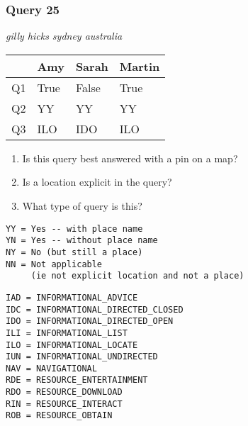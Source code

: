\begin{frame}[fragile]
\frametitle{Query 25}
\vspace{1em}

\emph{gilly hicks sydney australia}

\vfill

\begin{table}
  \centering
  \begin{tabular}{ l l l l }
    & \textbf{Amy} & \textbf{Sarah} & \textbf{Martin}\\
    \toprule
    Q1 & True & False & True\\
Q2 & YY & YY & YY\\
Q3 & ILO & IDO & ILO\\
    \bottomrule
  \end{tabular}
\end{table}

\vfill

\tiny{

\begin{enumerate}
\item Is this query best answered with a pin on a map?
\item Is a location explicit in the query?
\item What type of query is this?
\end{enumerate}

\vfill

\begin{multicols}{2}
\begin{verbatim}
YY = Yes -- with place name
YN = Yes -- without place name
NY = No (but still a place)
NN = Not applicable 
     (ie not explicit location and not a place)
\end{verbatim}

\columnbreak
\begin{verbatim}
IAD = INFORMATIONAL_ADVICE
IDC = INFORMATIONAL_DIRECTED_CLOSED
IDO = INFORMATIONAL_DIRECTED_OPEN
ILI = INFORMATIONAL_LIST
ILO = INFORMATIONAL_LOCATE
IUN = INFORMATIONAL_UNDIRECTED
NAV = NAVIGATIONAL
RDE = RESOURCE_ENTERTAINMENT
RDO = RESOURCE_DOWNLOAD
RIN = RESOURCE_INTERACT
ROB = RESOURCE_OBTAIN
\end{verbatim}
\end{multicols}
}

\end{frame}


